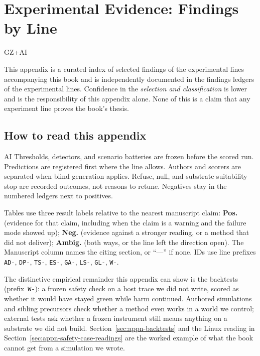 \chapter{Experimental Evidence: Findings by Line}
\label{appn-experimental-evidence}

\newcommand{\appnlinemeta}[3]{%
  \noindent\textbf{Location:} #1\\
  \textbf{First built:} #2\\
  \textbf{Ledger:} #3\par\smallskip}

\begin{authbar}{GZ+AI}
\begin{epistemicstatus}
This appendix is a curated index of selected findings of the experimental lines accompanying this book and is independently documented in the findings ledgers of the experimental lines. 
Confidence in the \emph{selection and classification} is lower and is the responsibility of this appendix alone.
None of this is a claim that any experiment line proves the book's thesis.
\end{epistemicstatus}
\end{authbar}

\authbarneedspace
\section{How to read this appendix}
\label{sec:appn-how-to-read}
\begin{authbar}{AI}
Thresholds, detectors, and scenario batteries are frozen before the scored run.
Predictions are registered first where the line allows.
Authors and scorers are separated when blind generation applies.
Refuse, null, and substrate-suitability stop are recorded outcomes, not reasons to retune.
Negatives stay in the numbered ledgers next to positives.

Tables use three result labels relative to the nearest manuscript claim: \textbf{Pos.} (evidence for that claim, including when the claim is a warning and the failure mode showed up); \textbf{Neg.} (evidence against a stronger reading, or a method that did not deliver); \textbf{Ambig.} (both ways, or the line left the direction open).
The Manuscript column names the citing section, or ``---'' if none.
IDs use line prefixes \texttt{AD-}, \texttt{DP-}, \texttt{TS-}, \texttt{ES-}, \texttt{GA-}, \texttt{LS-}, \texttt{GL-}, \texttt{W-}.

The distinctive empirical remainder this appendix can show is the backtests (prefix~\texttt{W-}): 
a frozen safety check on a host trace we did not write, scored as whether it would have stayed green while harm continued.
Authored simulations and sibling precursors check whether a method even works in a world we control; external tests ask whether a frozen instrument still means anything on a substrate we did not build.
Section~\ref{sec:appn-backtests} and the Linux reading in Section~\ref{sec:appn-safety-case-readings} are the worked example of what the book cannot get from a simulation we wrote.

\end{authbar}
\authbarneedspace
